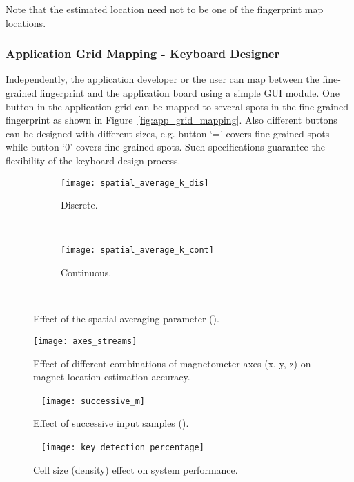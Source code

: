 \documentclass[conference]{IEEEtran}
\begin{document}
Note that the estimated location  need not to be one of the fingerprint map locations.

\subsubsection{Application Grid Mapping - Keyboard Designer}
Independently, the application developer or the user can map between the fine-grained fingerprint and the application board using a simple GUI module. One button in the application grid can be mapped to several spots in the fine-grained fingerprint as shown in Figure~\ref{fig:app_grid_mapping}. Also different buttons can be designed with different sizes, e.g. button `=' covers  fine-grained spots while button `0' covers  fine-grained spots. Such specifications guarantee the flexibility of the keyboard design process.

\begin{figure}[!t]
\centering
        \begin{subfigure}[t]{0.24\textwidth}
                \centering
                \texttt{[image: spatial\_average\_k\_dis]}
                \caption{Discrete.}
                \label{fig:k_discrete}
        \end{subfigure}~~
        \begin{subfigure}[t]{0.24\textwidth}
                \centering
                \texttt{[image: spatial\_average\_k\_cont]}
                \caption{Continuous.}
                \label{fig:k_continuous}
        \end{subfigure}~
\caption{Effect of the spatial averaging parameter ().}
\label{fig:spatial_averaging_parameter}
\vspace{-0.2in}
\end{figure}

\begin{figure*}[!t]
 \texttt{[image: axes\_streams]}
 \caption{Effect of different combinations of magnetometer axes (x, y, z) on magnet location estimation accuracy.}
 \label{fig:axes_combinattions}
\endminipage\hfill~
  \texttt{[image: successive\_m]}
 \caption{Effect of successive input samples ().} 
 \label{fig:successive_samples}
\endminipage\hfill~
\texttt{[image: key\_detection\_percentage]}
\caption{Cell size (density) effect on system performance.}
\label{fig:density}
\endminipage
\vspace{-0.1in}
\end{figure*}
\end{document}
